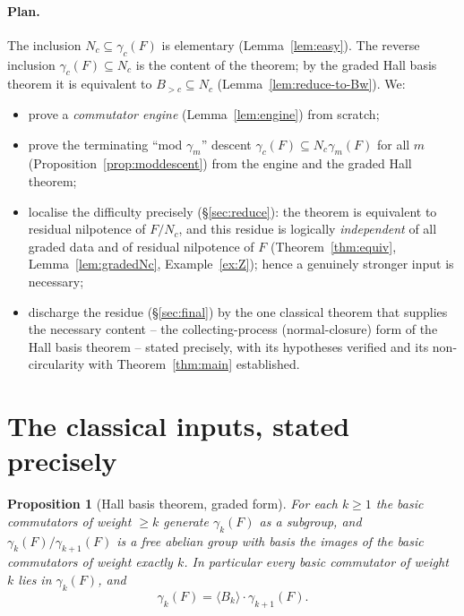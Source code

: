 \documentclass{amsart}
\newtheorem{proposition}{Proposition}
\theoremstyle{definition}
\theoremstyle{remark}
\begin{document}
\paragraph{Plan.}
The inclusion $N_c\subseteq\gamma_c(F)$ is elementary (Lemma~\ref{lem:easy}). The
reverse inclusion $\gamma_c(F)\subseteq N_c$ is the content of the theorem; by the
graded Hall basis theorem it is equivalent to $B_{>c}\subseteq N_c$
(Lemma~\ref{lem:reduce-to-Bw}). We:
\begin{itemize}
\item[(I)] prove a \emph{commutator engine} (Lemma~\ref{lem:engine}) from scratch;
\item[(II)] prove the terminating ``mod $\gamma_m$'' descent
$\gamma_c(F)\subseteq N_c\gamma_m(F)$ for all $m$ (Proposition~\ref{prop:moddescent})
from the engine and the graded Hall theorem;
\item[(III)] localise the difficulty precisely (\S\ref{sec:reduce}): the theorem is
equivalent to residual nilpotence of $F/N_c$, and this residue is logically
\emph{independent} of all graded data and of residual nilpotence of $F$
(Theorem~\ref{thm:equiv}, Lemma~\ref{lem:gradedNc}, Example~\ref{ex:Z}); hence a
genuinely stronger input is necessary;
\item[(IV)] discharge the residue (\S\ref{sec:final}) by the one classical theorem
that supplies the necessary content -- the collecting-process (normal-closure) form
of the Hall basis theorem -- stated precisely, with its hypotheses verified and its
non-circularity with Theorem~\ref{thm:main} established.
\end{itemize}

\section{The classical inputs, stated precisely}\label{sec:input}

\begin{proposition}[Hall basis theorem, graded form]\label{prop:hall}
For each $k\ge 1$ the basic commutators of weight $\ge k$ generate $\gamma_k(F)$
\emph{as a subgroup}, and $\gamma_k(F)/\gamma_{k+1}(F)$ is a free abelian group
with basis the images of the basic commutators of weight exactly $k$. In
particular every basic commutator of weight $k$ lies in $\gamma_k(F)$, and
\begin{equation}\label{eq:hall-decomp}
\gamma_k(F)=\langle B_k\rangle\cdot\gamma_{k+1}(F).
\end{equation}
\end{proposition}
\end{document}
